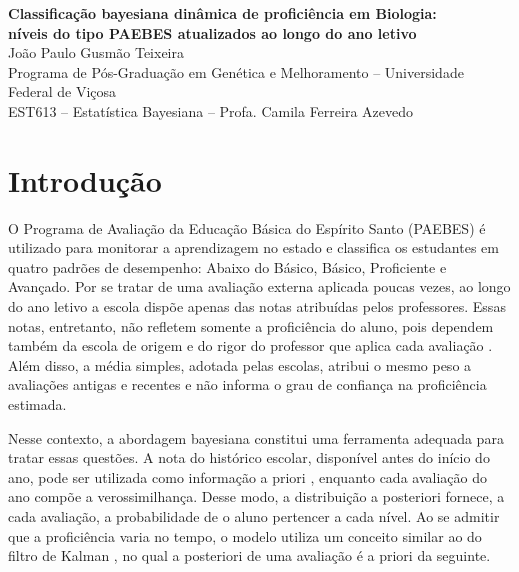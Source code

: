 \documentclass[12pt,a4paper]{article}
\begin{document}
\begin{center}
  {\large\bfseries Classificação bayesiana dinâmica de proficiência em Biologia:\\
  níveis do tipo PAEBES atualizados ao longo do ano letivo}\\[0.8em]
  João Paulo Gusmão Teixeira\\
  {\small Programa de Pós-Graduação em Genética e Melhoramento -- Universidade Federal de Viçosa\\
  EST613 -- Estatística Bayesiana -- Profa. Camila Ferreira Azevedo}
\end{center}

\section{Introdução}

O Programa de Avaliação da Educação Básica do Espírito Santo (PAEBES) é utilizado para
monitorar a aprendizagem no estado e classifica os estudantes em quatro padrões de desempenho:
Abaixo do Básico, Básico, Proficiente e Avançado. Por se tratar de uma avaliação externa
aplicada poucas vezes, ao longo do ano letivo a escola dispõe apenas das notas atribuídas pelos
professores. Essas notas, entretanto, não refletem somente a proficiência do aluno, pois
dependem também da escola de origem e do rigor do professor que aplica cada avaliação
\citep{zitzmann2025}. Além disso, a média simples, adotada pelas escolas, atribui o mesmo peso
a avaliações antigas e recentes e não informa o grau de confiança na proficiência estimada.

Nesse contexto, a abordagem bayesiana constitui uma ferramenta adequada para tratar essas
questões. A nota do histórico escolar, disponível antes do início do ano, pode ser utilizada
como informação a priori \citep{vanmoere2020}, enquanto cada avaliação do ano compõe a
verossimilhança. Desse modo, a distribuição a posteriori fornece, a cada avaliação, a
probabilidade de o aluno pertencer a cada nível. Ao se admitir que a proficiência varia no
tempo, o modelo utiliza um conceito similar ao do filtro de Kalman \citep{kalman1960}, no qual
a posteriori de uma avaliação é a priori da seguinte.
\end{document}
